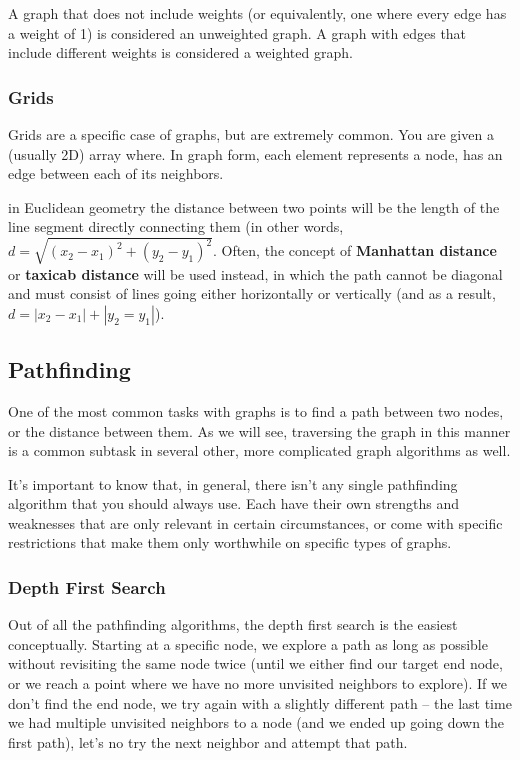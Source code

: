 A graph that does not include weights (or equivalently, one where every edge has a weight of 1) is considered an unweighted graph. A graph with edges that include different weights is considered a weighted graph.

\subsubsection{Grids}

Grids are a specific case of graphs, but are extremely common. You are given a (usually 2D) array where. In graph form, each element represents a node, has an edge between each of its neighbors. 

in Euclidean geometry the distance between two points will be the length of the line segment directly connecting them (in other words, $d = \sqrt{(x_2 - x_1)^2 + (y_2 - y_1)^2}$. Often, the concept of \textbf{Manhattan distance} or \textbf{taxicab distance} will be used instead, in which the path cannot be diagonal and must consist of lines going either horizontally or vertically (and as a result, $d = |x_2 - x_1| + |y_2 = y_1|$).

\subsection{Pathfinding}

One of the most common tasks with graphs is to find a path between two nodes, or the distance between them. As we will see, traversing the graph in this manner is a common subtask in several other, more complicated graph algorithms as well.

It's important to know that, in general, there isn't any single pathfinding algorithm that you should always use. Each have their own strengths and weaknesses that are only relevant in certain circumstances, or come with specific restrictions that make them only worthwhile on specific types of graphs.

\subsubsection{Depth First Search}

Out of all the pathfinding algorithms, the depth first search is the easiest conceptually. Starting at a specific node, we explore a path as long as possible without revisiting the same node twice (until we either find our target end node, or we reach a point where we have no more unvisited neighbors to explore). If we don't find the end node, we try again with a slightly different path -- the last time we had multiple unvisited neighbors to a node (and we ended up going down the first path), let's no try the next neighbor and attempt that path.

